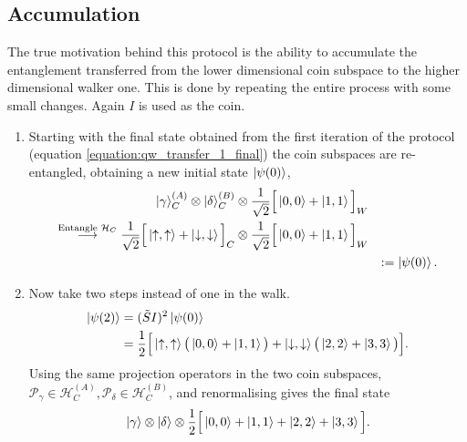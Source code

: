 \subsection{Accumulation}
\label{subsection:qw_accumulation}
The true motivation behind this protocol is the ability to accumulate the entanglement transferred from the lower dimensional coin subspace to the higher dimensional walker one.
This is done by repeating the entire process with some small changes.
Again $I$ is used as the coin.
\begin{enumerate}

    \item Starting with the final state obtained from the first iteration of the protocol (equation \ref{equation:qw_transfer_1_final}) the coin subspaces are re-entangled, obtaining a new initial state $\ket{\psi(0)}$,
    \begin{alignat}{3}
        \ket{\gamma}^{(A)}_C \otimes \ket{\delta}^{(B)}_C&\otimes \frac{1}{\sqrt{2}}\Big [\ket{0, 0} + \ket{1, 1}\Big ]_W\\
        \overset{\text{Entangle }\mathcal{H}_C}{\longrightarrow} \frac{1}{\sqrt{2}} \Big [\ket{\uparrow, \uparrow} + \ket{\downarrow, \downarrow}\Big ]_C&\otimes \frac{1}{\sqrt{2}}\Big [\ket{0, 0} + \ket{1, 1}\Big ]_W\\
        & &:=\ket{\psi(0)}.
    \end{alignat}
    \item Now take two steps instead of one in the walk.
    \begin{align}
        \ket{\psi(2)} &= (\tilde{S}I)^2\ket{\psi(0)}\\
        &= \frac{1}{2}\Big[\ket{\uparrow,\uparrow}\big (\ket{0,0}+\ket{1,1}\big ) + \ket{\downarrow,\downarrow}\big (\ket{2,2} + \ket{3,3}\big )\Big ].
    \end{align}
     Using the same projection operators in the two coin subspaces, $\mathcal{P}_\gamma \in \mathcal{H}^{(A)}_C,  \mathcal{P}_\delta \in \mathcal{H}^{(B)}_C$, and renormalising gives the final state
    \begin{equation}
        \ket{\gamma}\otimes\ket{\delta}\otimes\frac{1}{2}\Big[\ket{0,0} + \ket{1,1} + \ket{2,2} + \ket{3,3}\Big ].
    \end{equation}
\end{enumerate}

